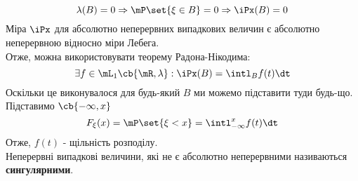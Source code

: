 \begin{equation}
\lambda(B)=0\Rightarrow \mP\set{\xi\in B} = 0 \Rightarrow \iPx(B) = 0
\end{equation}
Міра $\iPx$ для абсолютно неперервних випадкових величин є абсолютно неперервною відносно міри Лебега.\\
Отже, можна використовувати теорему Радона-Нікодима:
\begin{equation}
\exists f\in \mL_1\cb{\mR,\lambda}:\iPx(B)=\intl_B f(t)\dt
\end{equation}
Оскільки це виконувалося для будь-який $B$ ми можемо підставити туди будь-що. Підставимо $\cb{-\infty,x}$\\
\begin{equation}
F_\xi(x) = \mP\set{\xi<x} = \intl_{-\infty}^x f(t)\dt
\end{equation}
Отже, $f(t)$ - щільність розподілу.\\
Неперервні випадкові величини, які не є абсолютно неперервними називаються {\bf сингулярними}.\\